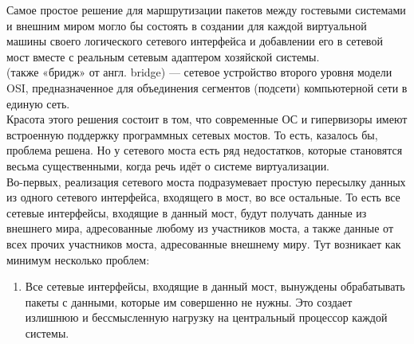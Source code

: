 \documentclass[14pt, a4paper]{article}
\begin{document}
Самое простое решение для маршрутизации пакетов между гостевыми системами и внешним миром
могло бы состоять в создании для каждой виртуальной машины своего логического сетевого
интерфейса и добавлении его в сетевой мост вместе с реальным сетевым адаптером хозяйской
системы.\\

\href{https://ru.wikipedia.org/wiki/Сетевой_мост}{} (также «бридж» от англ. bridge) — сетевое устройство второго уровня модели OSI,
предназначенное для объединения сегментов (подсети) компьютерной сети в единую сеть.\\

Красота этого решения состоит в том, что современные ОС и гипервизоры имеют встроенную
поддержку программных сетевых мостов. То есть, казалось бы, проблема решена. Но у сетевого
моста есть ряд недостатков, которые становятся весьма существенными, когда речь идёт о системе
виртуализации.\\

Во-первых, реализация сетевого моста подразумевает простую пересылку данных из одного сетевого
интерфейса, входящего в мост, во все остальные. То есть все сетевые интерфейсы, входящие в
данный мост, будут получать данные из внешнего мира, адресованные любому из участников моста, а
также данные от всех прочих участников моста, адресованные внешнему миру. Тут возникает как
минимум несколько проблем:

\begin{enumerate}
    \item Все сетевые интерфейсы, входящие в данный мост, вынуждены обрабатывать пакеты с
    данными, которые им совершенно не нужны. Это создает излишнюю и бессмысленную
    нагрузку на центральный процессор каждой системы.
\end{enumerate}
\end{document}
